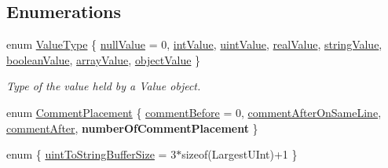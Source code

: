 \subsection*{Enumerations}
\begin{DoxyCompactItemize}
\item 
enum \hyperlink{namespace_json_a7d654b75c16a57007925868e38212b4e}{Value\+Type} \{ \newline
\hyperlink{namespace_json_a7d654b75c16a57007925868e38212b4ea7d9899633b4409bd3fc107e6737f8391}{null\+Value} = 0, 
\hyperlink{namespace_json_a7d654b75c16a57007925868e38212b4eae5a9d708d5c9e23ae9bf98898522512d}{int\+Value}, 
\hyperlink{namespace_json_a7d654b75c16a57007925868e38212b4eaea788d9a3bb00adc6d68d97d43e1ccd3}{uint\+Value}, 
\hyperlink{namespace_json_a7d654b75c16a57007925868e38212b4eab837c7b869c14d8be712deb45c9e490e}{real\+Value}, 
\newline
\hyperlink{namespace_json_a7d654b75c16a57007925868e38212b4ea804ef857affea2d415843c73f261c258}{string\+Value}, 
\hyperlink{namespace_json_a7d654b75c16a57007925868e38212b4ea14c30dbf4da86f7b809be299f671f7fd}{boolean\+Value}, 
\hyperlink{namespace_json_a7d654b75c16a57007925868e38212b4eadc8f264f36b55b063c78126b335415f4}{array\+Value}, 
\hyperlink{namespace_json_a7d654b75c16a57007925868e38212b4eae8386dcfc36d1ae897745f7b4f77a1f6}{object\+Value}
 \}\begin{DoxyCompactList}\small\item\em Type of the value held by a Value object. \end{DoxyCompactList}
\item 
enum \hyperlink{namespace_json_a4fc417c23905b2ae9e2c47d197a45351}{Comment\+Placement} \{ \hyperlink{namespace_json_a4fc417c23905b2ae9e2c47d197a45351a52f1733775460517b2ea6bedf4906d52}{comment\+Before} = 0, 
\hyperlink{namespace_json_a4fc417c23905b2ae9e2c47d197a45351a008a230a0586de54f30b76afe70fdcfa}{comment\+After\+On\+Same\+Line}, 
\hyperlink{namespace_json_a4fc417c23905b2ae9e2c47d197a45351ac5784ca53b12250888ddb642b06aebef}{comment\+After}, 
{\bfseries number\+Of\+Comment\+Placement}
 \}
\item 
enum \{ \hyperlink{namespace_json_a0c5f614b019f20b4598dcaec09d9e820ae4f2008c7919f20d81286121d1374424}{uint\+To\+String\+Buffer\+Size} = 3$\ast$sizeof(Largest\+U\+Int)+1
 \}
\end{DoxyCompactItemize}
